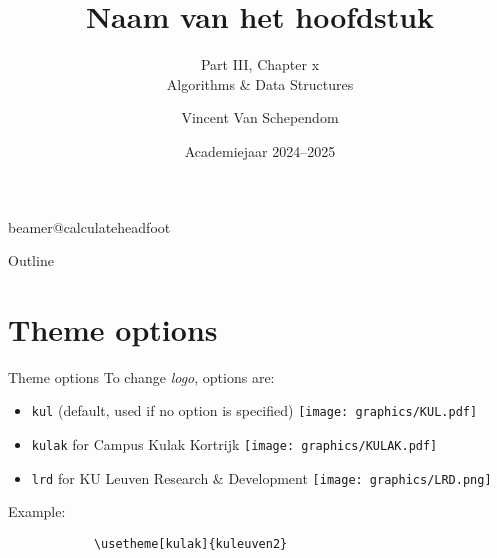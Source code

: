 \documentclass[11pt,t]{beamer}
\title[Footer]{Naam van het hoofdstuk} %
\subtitle{Part III, Chapter x\\Algorithms \& Data Structures}
\author{Vincent Van Schependom}
\institute{KU Leuven Campus Kulak Kortrijk}
\date{Academiejaar 2024--2025}
\begin{document}
	\csname beamer@calculateheadfoot\endcsname %


	\begin{frame}
		\titlepage
	\end{frame}


	\begin{frame}{Outline}
		\hfill	{\large \parbox{.961\textwidth}{\tableofcontents[hideothersubsections]}}
	\end{frame}







	\section{Theme options}
	\begin{frame}[fragile]{Theme options}  %
		To change \emph{logo}, options are:
		\begin{itemize}
			\item \texttt{kul} \qquad (default, used if no option is specified) \texttt{[image: graphics/KUL.pdf]}
			\item \texttt{kulak} \quad for Campus Kulak Kortrijk \texttt{[image: graphics/KULAK.pdf]}
			\item \texttt{lrd} \qquad for KU Leuven Research \& Development \texttt{[image: graphics/LRD.png]}
		\end{itemize}

		\vspace{24pt}
		Example:
		\begin{verbatim}
			\usetheme[kulak]{kuleuven2}
		\end{verbatim}
	\end{frame}
\end{document}

